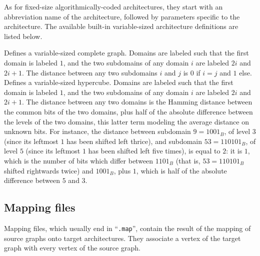 As for fixed-size algorithmically-coded architectures, they start with
an abbreviation name of the architecture, followed by parameters
specific to the architecture. The available built-in variable-sized
architecture definitions are listed below.
\begin{itemize}
Defines a variable-sized complete graph. Domains are labeled such
that the first domain is labeled $1$, and the two subdomains of
any domain $i$ are labeled $2i$ and $2i + 1$. The distance between
any two subdomains $i$ and $j$ is $0$ if $i=j$ and $1$ else.
Defines a variable-sized hypercube. Domains are labeled such that
the first domain is labeled $1$, and the two subdomains of any domain
$i$ are labeled $2i$ and $2i + 1$. The distance between any two
domains is the Hamming distance between the common bits of the two
domains, plus half of the absolute difference between the levels of
the two domains, this latter term modeling the average distance on
unknown bits.
For instance, the distance between subdomain $9=1001_B$, of level $3$
(since its leftmost $1$ has been shifted left thrice), and subdomain
$53=110101_B$, of level $5$ (since its leftmost $1$ has been shifted
left five times), is equal to $2$: it is $1$, which is the number of
bits which differ between $1101_B$ (that is, $53=110101_B$ shifted
rightwards twice) and $1001_B$, plus $1$, which is half of the
absolute difference between $5$ and $3$.
\end{itemize}

\subsection{Mapping files}
\label{sec-file-map}

Mapping files, which usually end in ``\texttt{\@.map}'', contain the
result of the mapping of source graphs onto target architectures. They
associate a vertex of the target graph with every vertex of the source
graph.

